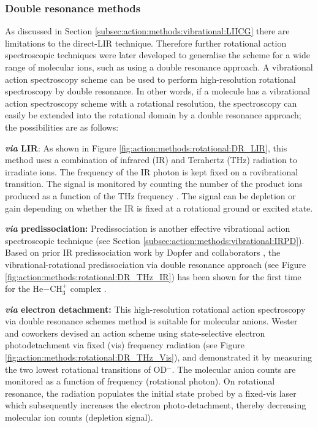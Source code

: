 \subsubsection{Double resonance methods}
\label{subsec:action:methods:rotational:DR}

As discussed in Section \ref{subsec:action:methods:vibrational:LIICG} there are
limitations to the direct-LIR technique. Therefore further rotational action
spectroscopic techniques were later developed to generalise the scheme for a
wide range of molecular ions, such as using a double resonance approach. A
vibrational action spectroscopy scheme can be used to perform high-resolution
rotational spectroscopy by double resonance. In other words, if a molecule has
a vibrational action spectroscopy scheme with a rotational resolution, the
spectroscopy can easily be extended into the rotational domain by a double
resonance approach; the possibilities are as follows:

\textbf{\emph{via} LIR}: As shown in Figure \ref{fig:action:methods:rotational:DR_LIR}, this method uses a combination of infrared (IR) and Terahertz (THz) radiation to irradiate ions. The frequency of the IR photon is kept fixed on a rovibrational transition. The signal is monitored by counting the number of the product ions produced as a function of the THz frequency \cite{Gartner2013,jusko_two-photon_2014}. The signal can be depletion or gain depending on whether the IR is fixed at a rotational ground or excited state.

\textbf{\emph{via} predissociation:} Predissociation is another effective vibrational action spectroscopic technique (see Section \ref{subsec:action:methods:vibrational:IRPD}). Based on prior IR predissociation work by Dopfer and collaborators \cite{olkhov_intermolecular_1999}, the vibrational-rotational predissociation via double resonance approach (see Figure \ref{fig:action:methods:rotational:DR_THz_IR}) has been shown for the first time for the He$-$CH$_3^+$ complex \cite{Topfer2018}.

\textbf{\emph{via} electron detachment:}
This high-resolution rotational action spectroscopy via double resonance schemes method is suitable for molecular anions. Wester and coworkers \cite{lee_terahertz-visible_2016} devised an action scheme using state-selective electron photodetachment via fixed  (vis) frequency radiation (see Figure \ref{fig:action:methods:rotational:DR_THz_Vis}), and demonstrated it by measuring the two lowest rotational transitions of OD$^-$. The molecular anion counts are monitored as a function of frequency (rotational photon). On rotational resonance, the radiation populates the initial state probed by a fixed-vis laser which subsequently increases the electron photo-detachment, thereby decreasing molecular ion counts (depletion signal).

